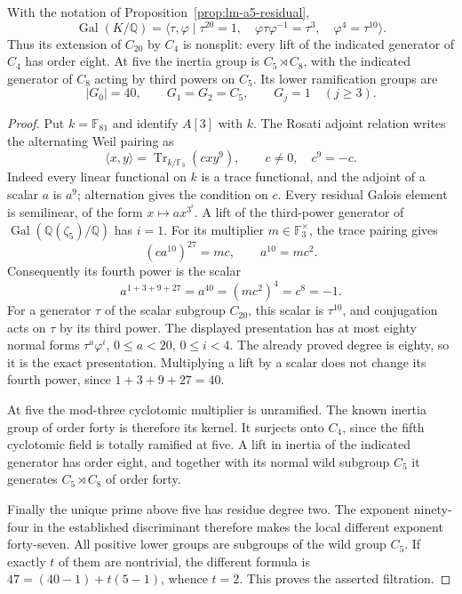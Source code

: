 \begin{lemma}
\label{lem:lm-quintic-residual-group}
With the notation of Proposition~\ref{prop:lm-a5-residual},
\[
 \operatorname{Gal}(K/\mathbb Q)=
 \langle\tau,\varphi\mid\tau^{20}=1,\quad
 \varphi\tau\varphi^{-1}=\tau^3,\quad \varphi^4=\tau^{10}\rangle.
\]
Thus its extension of $C_{20}$ by $C_4$ is nonsplit: every lift of the
indicated generator of $C_4$ has order eight. At five the inertia group
is $C_5\rtimes C_8$, with the indicated generator of $C_8$ acting by
third powers on $C_5$. Its lower ramification groups are
\[
 |G_0|=40,\qquad G_1=G_2=C_5,\qquad G_j=1\quad(j\ge3).
\]
\end{lemma}
\begin{proof}
Put $k=\mathbb F_{81}$ and identify $A[3]$ with $k$.
The Rosati adjoint relation writes the alternating Weil pairing as
\[
 \langle x,y\rangle=\operatorname{Tr}_{k/\mathbb F_3}(cxy^9),
 \qquad c\ne0,\quad c^9=-c.
\]
Indeed every linear functional on $k$ is a trace functional, and the
adjoint of a scalar $a$ is $a^9$; alternation gives the condition on $c$.
Every residual Galois element is semilinear, of the form
$x\mapsto ax^{3^i}$. A lift of the third-power generator of
$\operatorname{Gal}(\mathbb Q(\zeta_5)/\mathbb Q)$ has $i=1$.
For its multiplier $m\in\mathbb F_3^\times$, the trace pairing gives
\[
 (ca^{10})^{27}=mc,\qquad a^{10}=mc^2.
\]
Consequently its fourth power is the scalar
\[
 a^{1+3+9+27}=a^{40}=(mc^2)^4=c^8=-1.
\]
For a generator $\tau$ of the scalar subgroup $C_{20}$, this scalar
is $\tau^{10}$, and conjugation acts on $\tau$ by its third power.
The displayed presentation has at most eighty normal forms
$\tau^a\varphi^i$, $0\le a<20$, $0\le i<4$. The already proved degree
is eighty, so it is the exact presentation. Multiplying a lift by a
scalar does not change its fourth power, since $1+3+9+27=40$.

At five the mod-three cyclotomic multiplier is unramified. The known
inertia group of order forty is therefore its kernel. It surjects
onto $C_4$, since the fifth cyclotomic field is totally ramified at
five. A lift in inertia of the indicated generator has order eight,
and together with its normal wild subgroup $C_5$ it generates
$C_5\rtimes C_8$ of order forty.

Finally the unique prime above five has residue degree two. The
exponent ninety-four in the established discriminant therefore makes
the local different exponent forty-seven. All positive lower groups
are subgroups of the wild group $C_5$. If exactly $t$ of them are
nontrivial, the different formula is
$47=(40-1)+t(5-1)$, whence $t=2$. This proves the asserted filtration.
\end{proof}

